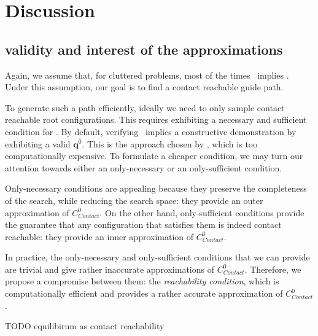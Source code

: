  \section{Discussion} 
\label{sec:discussion}

\subsection{validity and interest of the approximations}

Again, we assume that, for \gls{cluttered} problems, most of the times \contactreachability\, implies \equilibriumfeasibility.
Under this assumption, our goal is to find a \gls{contact reachable} guide path.

To generate such a path efficiently, ideally we need to only sample \gls{contact reachable} root configurations.
This requires exhibiting a necessary and sufficient condition for \contactreachability. %
By default, verifying \contactreachability\, implies a constructive demonstration by exhibiting a valid $\mathbf{q}^{\overline{0}}$. This is the approach chosen by \cite{Bouyarmane2009},
which is too computationally expensive.
To formulate a cheaper condition, we may turn our attention towards either an only-necessary or an only-sufficient condition.

Only-necessary conditions are appealing because they preserve the completeness of the search, while reducing 
the search space: they provide an outer approximation of $C_{Contact}^0$.
On the other hand, only-sufficient conditions provide the guarantee that any configuration that satisfies them is indeed \gls{contact reachable}:
they provide an inner approximation of $C_{Contact}^0$.

In practice, the only-necessary and only-sufficient conditions that we can provide are trivial and give rather inaccurate approximations of $C_{Contact}^0$.
Therefore, we propose a compromise between them: the \textit{reachability condition}, which is computationally efficient
and provides a rather accurate approximation of $C_{Contact}^0$.

TODO equilibirum as contact reachability

